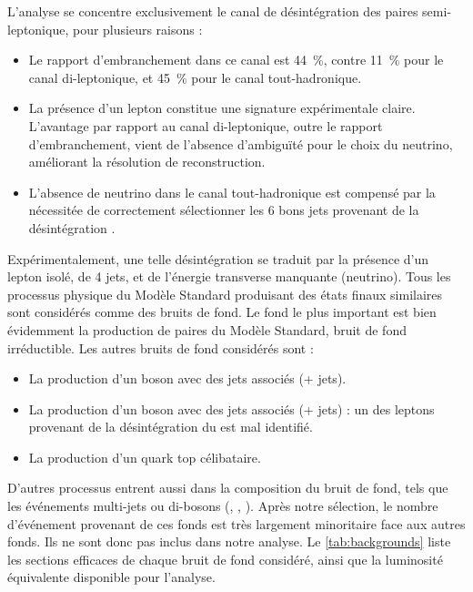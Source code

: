 \bigskip

L'analyse se concentre exclusivement le canal de désintégration des paires \ttbar semi-leptonique, pour plusieurs raisons :
\begin{itemize}
    \item Le rapport d'embranchement dans ce canal est \tilde\SI{44}{\%}, contre \SI{11}{\%} pour le canal di-leptonique, et \SI{45}{\%} pour le canal tout-hadronique.
    \item La présence d'un lepton constitue une signature expérimentale claire. L'avantage par rapport au canal di-leptonique, outre le rapport d'embranchement, vient de l'absence d'ambiguïté pour le choix du neutrino, améliorant la résolution de reconstruction.
    \item L'absence de neutrino dans le canal tout-hadronique est compensé par la nécessitée de correctement sélectionner les 6 bons jets provenant de la désintégration \ttbar.
\end{itemize}

Expérimentalement, une telle désintégration se traduit par la présence d'un lepton isolé, de 4 jets, et de l'énergie transverse manquante (neutrino). Tous les processus physique du Modèle Standard produisant des états finaux similaires sont considérés comme des bruits de fond. Le fond le plus important est bien évidemment la production de paires \ttbar du Modèle Standard, bruit de fond irréductible. Les autres bruits de fond considérés sont :
\begin{itemize}
    \item La production d'un boson \PW avec des jets associés (\PW + jets).
    \item La production d'un boson \PZ avec des jets associés (\PZ + jets) : un des leptons provenant de la désintégration du \PZ est mal identifié.
    \item La production d'un quark top célibataire.
\end{itemize}

D'autres processus entrent aussi dans la composition du bruit de fond, tels que les événements multi-jets ou di-bosons (\PW{}\PW, \PZ{}\PZ, \PW{}\PZ). Après notre sélection, le nombre d'événement provenant de ces fonds est très largement minoritaire face aux autres fonds. Ils ne sont donc pas inclus dans notre analyse. Le \cref{tab:backgrounds} liste les sections efficaces de chaque bruit de fond considéré, ainsi que la luminosité équivalente disponible pour l'analyse.


